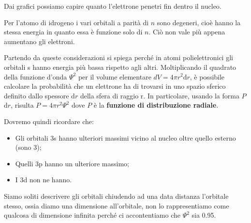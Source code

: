 
\vspace{0.2cm}Dai grafici possiamo capire quanto l'elettrone penetri fin dentro il nucleo.

\vspace{0.2cm}Per l'atomo di idrogeno i vari orbitali a parità di $n$ sono degeneri, cioè hanno la stessa energia in quanto essa è funzione solo di $n$. Ciò non vale più appena aumentano gli elettroni.

\vspace{0.2cm}Partendo da queste considerazioni si spiega perché in atomi polielettronici gli orbitali s hanno energia più bassa rispetto agli altri.
Moltiplicando il quadrato della funzione d'onda $\Psi^2$ per il volume elementare $dV=4\pi r^2\text{d}r$, è possibile calcolare la probabilità che un elettrone ha di trovarsi in uno spazio sferico definito dallo spessore d$r$ della sfera di raggio r. In particolare, usando la forma $P$d$r$, risulta $P=4\pi r^2\Psi^2$ dove $P$ è la \textbf{funzione di distribuzione radiale}.


\vspace{0.2cm}Dovremo quindi ricordare che:
\begin{itemize}
  \item Gli orbitali 3s hanno ulteriori massimi vicino al nucleo oltre quello esterno (sono 3);
  \item Quelli 3p hanno un ulteriore massimo;
  \item I 3d non ne hanno.
\end{itemize}
Siamo soliti descrivere gli orbitali chiudendo ad una data distanza l'orbitale stesso, ossia diamo una dimensione all'orbitale, non lo rappresentiamo come qualcosa di dimensione infinita perché ci accontentiamo che $\Psi^2$ sia 0.95.
